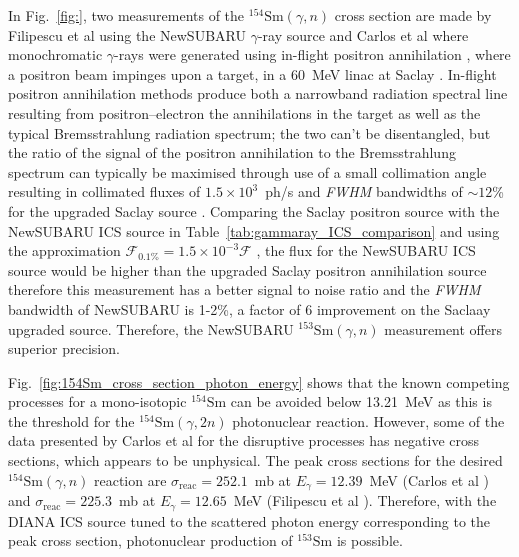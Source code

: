 \documentclass[../main.tex]{subfiles}
\begin{document}
In Fig.~\ref{fig:}, two measurements of the $^{154}\mathrm{Sm}\left(\gamma,n\right)$ cross section are made by Filipescu et al \cite{filipescu2014photoneutron} using the NewSUBARU $\gamma$-ray source \cite{utsunomiya2015gamma} and Carlos et al \cite{carlos1974giant} where monochromatic $\gamma$-rays were generated using in-flight positron annihilation \cite{miller1960monochromatic}, where a positron beam impinges upon a target, in a 60~\si{\mega\electronvolt} linac at Saclay \cite{audit1970etude}. In-flight positron annihilation methods produce both a narrowband radiation spectral line resulting from positron--electron the annihilations in the target as well as the typical Bremsstrahlung radiation spectrum; the two can't be disentangled, but the ratio of the signal of the positron annihilation to the Bremsstrahlung spectrum can typically be maximised through use of a small collimation angle resulting in collimated fluxes of $1.5\times10^{3}$~ph/\si{\second} and \textit{FWHM} bandwidths of $\sim 12$\% for the upgraded Saclay source \cite{veyssiere1979quasi}. Comparing the Saclay positron source with the NewSUBARU ICS source in Table~\ref{tab:gammaray_ICS_comparison} and using the approximation $\mathcal{F}_{\mathrm{0.1\%}} = 1.5\times 10^{-3}\mathcal{F}$ \cite{krafft2010compton}, the flux for the NewSUBARU ICS source would be higher than the upgraded Saclay positron annihilation source \cite{veyssiere1979quasi} therefore this measurement has a better signal to noise ratio and the \textit{FWHM} bandwidth of NewSUBARU is 1-2\%, a factor of 6 improvement on the Saclaay upgraded source. Therefore, the NewSUBARU $^{153}\mathrm{Sm}\left(\gamma,n\right)$ measurement offers superior precision. 


Fig.~\ref{fig:154Sm_cross_section_photon_energy} shows that the known competing processes for a mono-isotopic $^{154}\mathrm{Sm}$ can be avoided below 13.21~\si{\mega\electronvolt} as this is the threshold for the $^{154}\mathrm{Sm}\left(\gamma,2n\right)$ photonuclear reaction. However, some of the data presented by Carlos et al \cite{carlos1974giant} for the disruptive processes has negative cross sections, which appears to be unphysical. The peak cross sections for the desired $^{154}\mathrm{Sm}\left(\gamma,n\right)$ reaction are $\sigma_{\mathrm{reac}} = 252.1$~\si{\milli\barn} at $E_{\gamma} = 12.39$~\si{\mega\electronvolt} (Carlos et al \cite{carlos1974giant}) and $\sigma_{\mathrm{reac}} = 225.3$~\si{\milli\barn} at $E_{\gamma} = 12.65$~\si{\mega\electronvolt} (Filipescu et al \cite{filipescu2014photoneutron}). Therefore, with the DIANA ICS source tuned to the scattered photon energy corresponding to the peak cross section, photonuclear production of $^{153}\mathrm{Sm}$ is possible.
\end{document}
